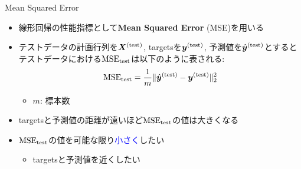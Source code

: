 \documentclass[dvipdfmx, 10pt]{beamer}
\newcommand{\green}[1]{\textcolor{green!40!black}{#1}}
\begin{document}

\begin{frame}{Mean Squared Error}
  \begin{itemize}
    \item 線形回帰の性能指標として{\bf Mean Squared Error} (MSE)を用いる
    \item テストデータの計画行列を$\bm{X} ^ {\rm (test)}$, targetsを$\bm{y} ^ {\rm (test)}$, 予測値を$\hat{\bm{y}} ^ {\rm (test)}$とすると
    テストデータにおける$\mathrm{MSE}_{\rm test}$は以下のように表される: 
    \begin{equation}
       \mathrm{MSE}_{\rm test} = \dfrac{1} {m} \| \hat{\bm{y}} ^ {\rm (test)} - \bm{y} ^ {\rm (test)} \| _{2}^{2}
    \end{equation}
    \begin{itemize}
      \item $m$: 標本数
    \end{itemize}
    \item targetsと予測値の距離が遠いほど$\mathrm{MSE}_{\rm test}$の値は大きくなる
    \item $\mathrm{MSE}_{\rm test}$の値を可能な限り\textcolor{blue}{小さく}したい
    \begin{itemize}
      \item targetsと予測値を近くしたい
    \end{itemize}
  \end{itemize}
\end{frame}

\end{document}
